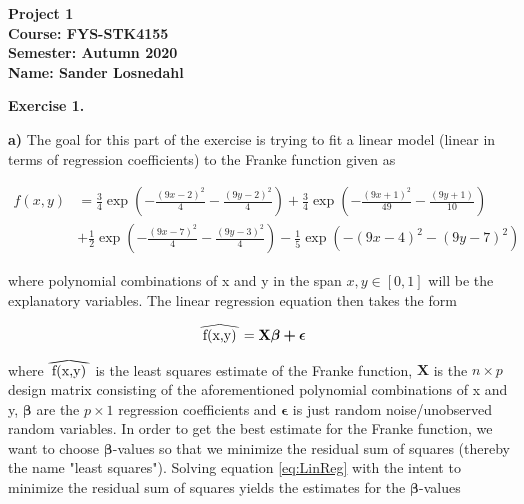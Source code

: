 \documentclass[12pt,a4paper]{article}
\newcommand\reallywidehat[1]{%
\savestack{\tmpbox}{\stretchto{%
  \scaleto{%
    \scalerel*[\widthof{\ensuremath{#1}}]{\kern-.6pt\bigwedge\kern-.6pt}%
    {\rule[-\textheight/2]{1ex}{\textheight}}%
  }{\textheight}%
}{0.5ex}}%
\stackon[1pt]{#1}{\tmpbox}%
}
\begin{document}
\begin{center}
\LARGE{\textbf{Project 1}}
\\
\large{\textbf{Course: FYS-STK4155}}
\\
\large{\textbf{Semester: Autumn 2020}}
\\
\large{\textbf{Name: Sander Losnedahl}}
\end{center}


\newpage

\begin{center}
\Large{\textbf{Exercise 1.}}
\end{center}

\noindent \textbf{a)} The goal for this part of the exercise is trying to fit a linear model (linear in terms of regression coefficients) to the Franke function given as

\begin{equation}\label{eq:Franke}
\begin{aligned}
f(x,y) &= \frac{3}{4}\exp{\left(-\frac{(9x-2)^2}{4} - \frac{(9y-2)^2}{4}\right)}+\frac{3}{4}\exp{\left(-\frac{(9x+1)^2}{49}- \frac{(9y+1)}{10}\right)} \\
&+\frac{1}{2}\exp{\left(-\frac{(9x-7)^2}{4} - \frac{(9y-3)^2}{4}\right)} -\frac{1}{5}\exp{\left(-(9x-4)^2 - (9y-7)^2\right) }
\end{aligned}
\end{equation}

\noindent where polynomial combinations of x and y in the span $x,y \in [0,1]$ will be the explanatory variables. The linear regression equation then takes the form

\begin{equation}\label{eq:LinReg}
\begin{aligned}
\reallywidehat{f(x,y)} &= \textbf{X} \boldsymbol{\beta + \epsilon}
\end{aligned}
\end{equation}

\noindent where $\reallywidehat{f(x,y)}$ is the least squares estimate of the Franke function, $\textbf{X}$ is the $n\times p$ design matrix consisting of the aforementioned polynomial combinations of x and y, $\boldsymbol{\beta}$ are the $p\times 1$ regression coefficients and $\boldsymbol{\epsilon}$ is just random noise/unobserved random variables. In order to get the best estimate for the Franke function, we want to choose $\boldsymbol{\beta}$-values so that we minimize the residual sum of squares (thereby the name "least squares"). Solving equation \ref{eq:LinReg} with the intent to minimize the residual sum of squares yields the estimates for the $\boldsymbol{\beta}$-values 
\end{document}
